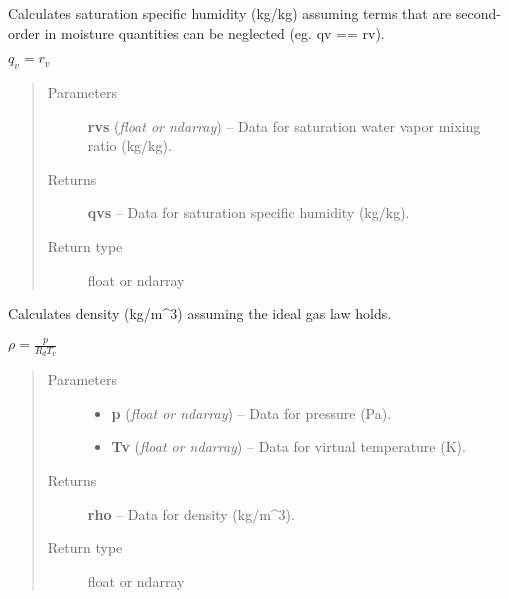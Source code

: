 \documentclass[letterpaper,10pt,english]{sphinxmanual}
\begin{document}

\begin{fulllineitems}
\label{atmos:atmos.equations.qvs_from_rvs_lwv}
Calculates saturation specific humidity (kg/kg) assuming terms that are second-
order in moisture quantities can be neglected (eg. qv == rv).

\(q_v = r_v\)
\begin{quote}\begin{description}
\item[{Parameters}] \leavevmode
\textbf{rvs} (\emph{float or ndarray}) -- Data for saturation water vapor mixing ratio (kg/kg).

\item[{Returns}] \leavevmode
\textbf{qvs} --
Data for saturation specific humidity (kg/kg).

\item[{Return type}] \leavevmode
float or ndarray

\end{description}\end{quote}

\end{fulllineitems}


\begin{fulllineitems}
\label{atmos:atmos.equations.rho_from_p_Tv_ideal_gas}
Calculates density (kg/m\textasciicircum{}3) assuming the ideal gas law holds.

\(\rho = \frac{p}{R_d T_v}\)
\begin{quote}\begin{description}
\item[{Parameters}] \leavevmode\begin{itemize}
\item {} 
\textbf{p} (\emph{float or ndarray}) -- Data for pressure (Pa).

\item {} 
\textbf{Tv} (\emph{float or ndarray}) -- Data for virtual temperature (K).

\end{itemize}

\item[{Returns}] \leavevmode
\textbf{rho} --
Data for density (kg/m\textasciicircum{}3).

\item[{Return type}] \leavevmode
float or ndarray

\end{description}\end{quote}

\end{fulllineitems}
\end{document}
